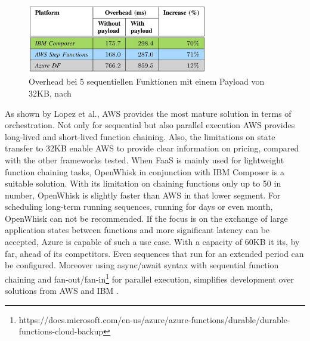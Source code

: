 \documentclass[a4paper,twoside,11pt, pagesize]{scrartcl}
\begin{document}
\begin{figure}[H]
\caption{Overhead bei 5 sequentiellen Funktionen mit einem Payload von 32KB, nach \cite{lopez2018comparison}}
\label{fig:orchestration}
\centering
\includegraphics[width=0.7\textwidth]{Orchestration}
\end{figure} 
As shown by Lopez et al., AWS provides the most mature solution in terms of orchestration. Not only for sequential but also parallel execution AWS provides long-lived and short-lived function chaining. Also, the limitations on state transfer to 32KB enable AWS to provide clear information on pricing, compared with the other frameworks tested. When FaaS is mainly used for lightweight function chaining tasks, OpenWhisk in conjunction with IBM Composer is a suitable solution. With its limitation on chaining functions only up to 50 in number, OpenWhisk is slightly faster than AWS in that lower segment. For scheduling long-term running sequences, running for days or even month, OpenWhisk can not be recommended. If the focus is on the exchange of large application states between functions and more significant latency can be accepted, Azure is capable of such a use case. With a capacity of 60KB it its, by far, ahead of its competitors. Even sequences that run for an extended period can be configured. Moreover using async/await syntax with sequential function chaining and fan-out/fan-in\footnote{https://docs.microsoft.com/en-us/azure/azure-functions/durable/durable-functions-cloud-backup} for parallel execution, simplifies development over solutions from AWS and IBM \cite{lopez2018comparison}.
\end{document}
